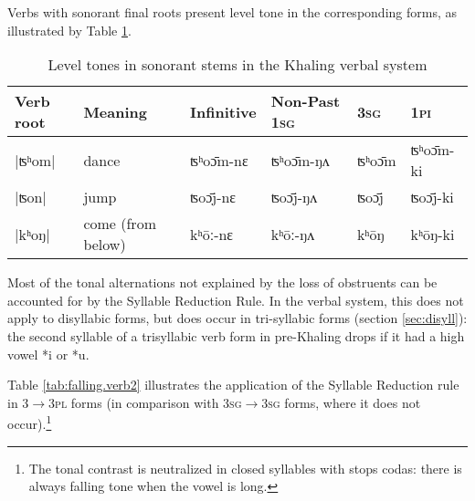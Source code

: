 \documentclass[oldfontcommands,oneside,a4paper,11pt]{article}
\newcommand{\ipa}[1]{{\phon \mbox{#1}}} %
\begin{document}
Verbs with sonorant final roots present level tone in the corresponding forms, as illustrated by Table \ref{tab:level.verb}.


\begin{table}[H]
\caption{Level tones in sonorant stems in the Khaling verbal system} \centering \label{tab:level.verb}
\begin{tabular}{llllll}
\toprule
Verb root	&Meaning	&Infinitive  & Non-Past \textsc{1sg} &  \textsc{3sg} &  \textsc{1pi}\\
\midrule
|ʦʰom|	&	dance		&\ipa{ʦʰoɔ̄m-nɛ}		&\ipa{ʦʰoɔ̄m-ŋʌ}&\ipa{ʦʰoɔ̄m} &\ipa{ʦʰoɔ̄m-ki} \\
|ʦon|	&	jump		&\ipa{ʦoɔ̄j-nɛ}		&\ipa{ʦoɔ̄j-ŋʌ}&\ipa{ʦoɔ̄j} &\ipa{ʦoɔ̄j-ki} \\
|kʰoŋ|	&	come (from below)		&\ipa{kʰōː-nɛ}		&\ipa{kʰōː-ŋʌ}&\ipa{kʰōŋ} &\ipa{kʰōŋ-ki} \\
\bottomrule
\end{tabular}
\end{table}



Most of the tonal alternations not explained by the loss of obstruents can be accounted for by the  Syllable Reduction Rule. In the verbal system, this does not apply to disyllabic forms, but does  occur in tri-syllabic forms (section \ref{sec:disyll}): the second syllable of a trisyllabic verb form in pre-Khaling drops if it had a high vowel \ipa{*i} or \ipa{*u}.

Table  \ref{tab:falling.verb2} illustrates the application of the Syllable Reduction rule in \textsc{3$\rightarrow$3pl} forms (in comparison with \textsc{3sg$\rightarrow$3sg} forms, where it does not occur).\footnote{The tonal contrast is neutralized  in closed syllables with stops codas: there is always falling tone when the vowel is long. }
 
\end{document}
